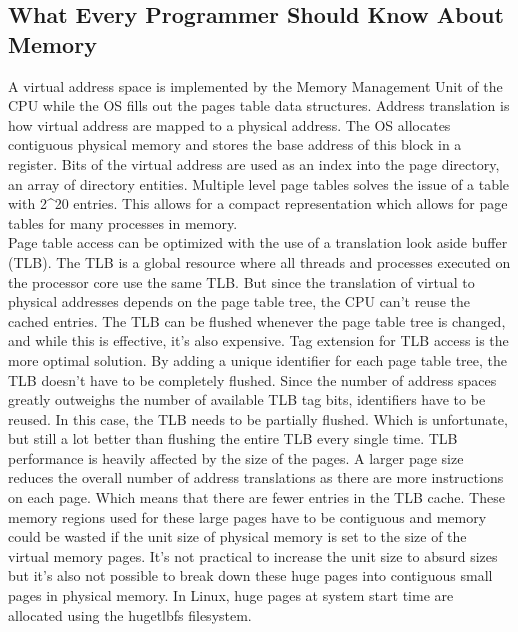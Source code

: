 \documentclass[letterpaper,10pt,titlepage]{article}
\begin{document}
\subsection*{What Every Programmer Should Know About Memory}
 A virtual address space is implemented by the Memory Management Unit of the CPU while the OS fills out the pages table data structures. Address translation is how virtual address are mapped to a physical address. The OS allocates contiguous physical memory and stores the base address of this block in a register. Bits of the virtual address are used as an index into the page directory, an array of directory entities. Multiple level page tables solves the issue of a table with 2\^{}20 entries. This allows for a compact representation which allows for page tables for many processes in memory. \\

\noindent Page table access can be optimized with the use of a translation look aside buffer (TLB). The TLB is a global resource where all threads and processes executed on the processor core use the same TLB. But since the translation of virtual to physical addresses depends on the page table tree, the CPU can't reuse the cached entries. The TLB can be flushed whenever the page table tree is changed, and while this is effective, it's also expensive. Tag extension for TLB access is the more optimal solution. By adding a unique identifier for each page table tree, the TLB doesn't have to be completely flushed. Since the number of address spaces greatly outweighs the number of available TLB tag bits, identifiers have to be reused. In this case, the TLB needs to be partially flushed. Which is unfortunate, but still a lot better than flushing the entire TLB every single time. TLB performance is heavily affected by the size of the pages. A larger page size reduces the overall number of address translations as there are more instructions on each page. Which means that there are fewer entries in the TLB cache. These memory regions used for these large pages have to be contiguous  and memory could be wasted if the unit size of physical memory is set to the size of the virtual memory pages. It's not practical to increase the unit size to absurd sizes but it's also not possible to break down these huge pages into contiguous small pages in physical memory. In Linux, huge pages at system start time are allocated using the hugetlbfs filesystem. \\

\pagebreak



\end{document}
